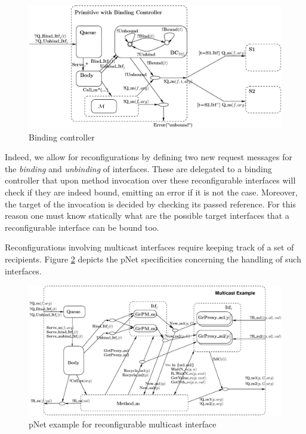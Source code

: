 	
\begin{figure}%
		\centering
		\includegraphics[scale=0.5]{figures/chapter2/pNets-primitiveBC.eps}
		\caption{Binding controller}
		\label{fig:bc}		
\end{figure}	

	Indeed, we allow for reconfigurations by defining two new request messages for the \textit{binding} and \textit{unbinding}
		of interfaces. These are delegated to a binding controller that upon method invocation over these
		reconfigurable interfaces will check if they are indeed bound, emitting an error if it is not the case. Moreover, the 
		target of the invocation is decided by checking its passed reference. For this reason one must know statically what are the 
		possible target interfaces that a reconfigurable interface can be bound too.
	


	  Reconfigurations involving multicast interfaces require keeping track of a set of recipients.	  
	  Figure \ref{fig:mc} depicts the pNet specificities concerning the handling of such interfaces.


\begin{figure}[H]
		\centering
		\includegraphics[scale=0.45]{figures/chapter2/pNets-MulticastExample.eps}
		\caption{pNet example for reconfigurable multicast interface}
		\label{fig:mc}		
\end{figure}	


